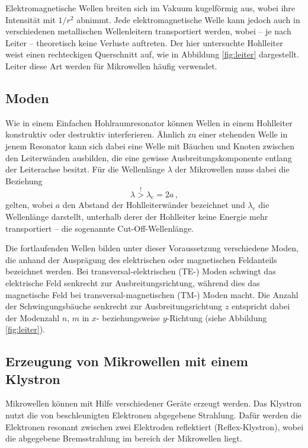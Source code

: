 Elektromagnetische Wellen breiten sich im Vakuum kugelförmig aus, wobei ihre
Intensität mit $1 / r^2$ abnimmt.
Jede elektromagnetische Welle kann jedoch auch in verschiedenen metallischen
Wellenleitern transportiert werden, wobei -- je nach Leiter -- theoretisch
keine Verluste auftreten.
Der hier untersuchte Hohlleiter weist einen rechteckigen Querschnitt auf,
wie in Abbildung \ref{fig:leiter} dargestellt.
Leiter diese Art werden für Mikrowellen häufig verwendet.

\subsection{Moden}
\label{subse:moden}
Wie in einem Einfachen Hohlraumresonator können Wellen in einem Hohlleiter
konstruktiv oder destruktiv interferieren.
Ähnlich zu einer stehenden Welle in jenem Resonator kann sich dabei eine Welle
mit Bäuchen und Knoten zwischen den Leiterwänden ausbilden, die eine gewisse
Ausbreitungskomponente entlang der Leiterachse besitzt.
Für die Wellenlänge $\lambda$ der Mikrowellen muss dabei die Beziehung
\begin{equation*}
    \lambda \overset{!}{>} \lambda_\text{c} = 2a\,,
\end{equation*}
gelten, wobei $a$ den Abstand der Hohlleiterwänder bezeichnet und
$\lambda_\text{c}$ die Wellenlänge darstellt, unterhalb derer der Hohlleiter
keine Energie mehr transportiert -- die sogenannte Cut-Off-Wellenlänge.

Die fortlaufenden Wellen bilden unter dieser Voraussetzung verschiedene Moden,
die anhand der Ausprägung des elektrischen oder magnetischen Feldanteils
bezeichnet werden.
Bei transversal-elektrischen (TE-) Moden schwingt das elektrische Feld
senkrecht zur Ausbreitungsrichtung, während dies das magnetische Feld
bei transversal-magnetischen (TM-) Moden macht.
Die Anzahl der Schwingungsbäuche senkrecht zur Ausbreitungsrichtung $z$
entspricht dabei der Modenzahl $n$, $m$ in $x$- beziehungsweise $y$-Richtung
(siehe Abbildung \ref{fig:leiter}).

\subsection{Erzeugung von Mikrowellen mit einem Klystron}
\label{subsec:klystron}
Mikrowellen können mit Hilfe verschiedener Geräte erzeugt werden.
Das Klystron nutzt die von beschleunigten Elektronen abgegebene Strahlung.
Dafür werden die Elektronen resonant zwischen zwei Elektroden reflektiert
(Reflex-Klystron), wobei die abgegebene Bremsstrahlung im bereich der
Mikrowellen liegt.

